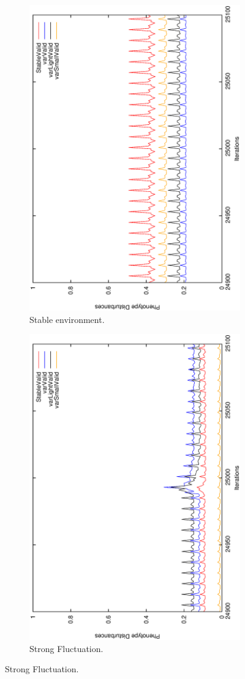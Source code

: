 \begin{figure}[H]
\begin{subfigure}{.25\textwidth}
  \centering
  \includegraphics[width=.7\linewidth, angle =-90]{img/avg499999stableb.eps}
  \caption{Stable environment.}
  \label{fig:sfig1}
\end{subfigure}%
\begin{subfigure}{.25\textwidth}
  \centering
  \includegraphics[width=.7\linewidth, angle =-90]{img/avg499999variationb.eps}
  \caption{Strong Fluctuation.}
  \label{fig:sfig2}
\end{subfigure}


\end{figure}
